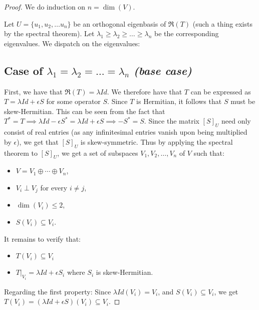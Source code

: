 \documentclass[
]{article}
\theoremstyle{theorem}
\theoremstyle{proposition}
\begin{document}
\begin{proof}
We do induction on \(n = \dim(V)\).

Let \(U = \{u_1, u_2, \dots u_n\}\) be an orthogonal eigenbasis of \(\Re(T)\) (such a thing exists by the spectral theorem). Let \(\lambda_1 \geq \lambda_2 \geq \dots \geq \lambda_n\) be the corresponding eigenvalues. We dispatch on the eigenvalues:

\hypertarget{case-of-lambda_1-lambda_2-dots-lambda_n-base-case}{%
\subsection*{\texorpdfstring{Case of \(\lambda_1 = \lambda_2 = \dots = \lambda_n\) \emph{(base case)}}{Case of \textbackslash lambda\_1 = \textbackslash lambda\_2 = \textbackslash dots = \textbackslash lambda\_n (base case)}}\label{case-of-lambda_1-lambda_2-dots-lambda_n-base-case}}

First, we have that \(\Re(T) = \lambda Id\). We therefore have that \(T\) can be expressed as \(T = \lambda Id + \epsilon S\) for some operator \(S\). Since \(T\) is Hermitian, it follows that \(S\) must be skew-Hermitian. This can be seen from the fact that \(T^* = T \implies \lambda Id - \epsilon S^* = \lambda Id + \epsilon S \implies -S^* = S\). Since the matrix \([S]_U\) need only consist of real entries (as any infinitesimal entries vanish upon being multiplied by \(\epsilon\)), we get that \([S]_U\) is skew-symmetric. Thus by applying the spectral theorem to \([S]_U\), we get a set of subspaces \(V_1, V_2, \dots, V_n\) of \(V\) such that:

\begin{itemize}
\item
  \(V = V_1 \oplus \dotsb \oplus V_n\),
\item
  \(V_i \perp V_j\) for every \(i \neq j\),
\item
  \(\dim(V_i) \leq 2\),
\item
  \(S(V_i) \subseteq V_i\).
\end{itemize}

It remains to verify that:

\begin{itemize}
\item
  \(T(V_i) \subseteq V_i\)
\item
  \(T|_{V_i} = \lambda Id + \epsilon S_i\) where \(S_i\) is skew-Hermitian.
\end{itemize}

Regarding the first property: Since \(\lambda Id (V_i) = V_i\), and \(S(V_i) \subseteq V_i\), we get \(T(V_i) = (\lambda Id + \epsilon S)(V_i) \subseteq V_i\).


\end{proof}
\end{document}
